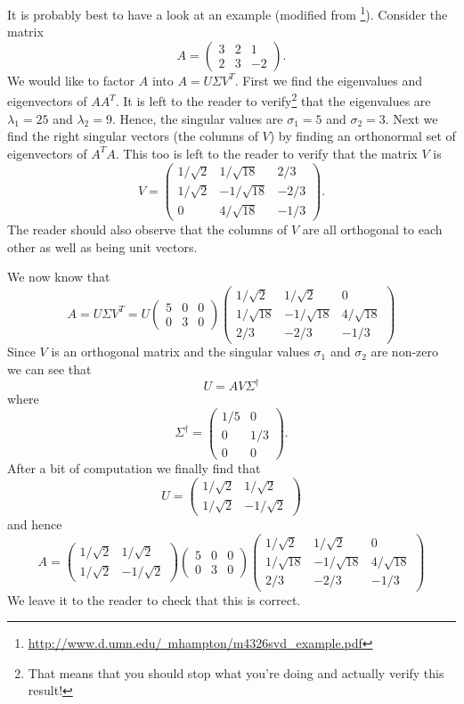It is probably best to have a look at an example (modified from
\footnote{\href{http://www.d.umn.edu/~mhampton/m4326svd_example.pdf}{http://www.d.umn.edu/~mhampton/m4326svd\_example.pdf}}).  Consider the matrix 
\[ A = \begin{pmatrix} 3 & 2 & 1 \\ 2 & 3 & -2 \end{pmatrix}. \]
We would like to factor $A$ into $A = U \Sigma V^T$.  First we find the eigenvalues and
eigenvectors of $AA^T$.  It is left to the reader to verify\footnote{That means that you
should stop what you're doing and actually verify this result!} that the eigenvalues are
$\lambda_1 = 25$ and $\lambda_2 = 9$.  Hence, the singular values are $\sigma_1 = 5$ and
$\sigma_2 = 3$.  Next we find the right singular vectors (the columns of $V$) by finding
an orthonormal set of eigenvectors of $A^TA$.  This too is left to the reader to verify
that the matrix $V$ is 
\[ V = \begin{pmatrix}
        1/\sqrt{2} & 1/\sqrt{18} & 2/3 \\
        1/\sqrt{2} & -1/\sqrt{18} & -2/3 \\
        0 & 4/\sqrt{18} & -1/3 
    \end{pmatrix}. \]
The reader should also observe that the columns of $V$ are all orthogonal to each other as
well as being unit vectors.

We now know that 
\[ A = U \Sigma V^T = U \begin{pmatrix} 5 & 0 & 0 \\ 0 & 3 & 0 \end{pmatrix} \begin{pmatrix} 1/\sqrt{2} & 1/\sqrt{2} & 0 \\ 1/\sqrt{18} & -1/\sqrt{18} &
        4/\sqrt{18} \\ 2/3 & -2/3 & -1/3 \end{pmatrix} \]
Since $V$ is an orthogonal matrix and the singular values $\sigma_1$ and $\sigma_2$ are
non-zero we can see that 
\[ U = AV\Sigma^\dagger \]
where 
\[ \Sigma^\dagger = \begin{pmatrix} 1/5 & 0 \\ 0 & 1/3 \\ 0 & 0 \end{pmatrix}. \]
After a bit of computation we finally find that 
\[ U = \begin{pmatrix} 1/\sqrt{2} & 1/\sqrt{2} \\ 1/\sqrt{2} & -1/\sqrt{2} \end{pmatrix}
        \]
and hence
\[ A = \begin{pmatrix} 1/\sqrt{2} & 1/\sqrt{2} \\ 1/\sqrt{2} & -1/\sqrt{2} \end{pmatrix} \begin{pmatrix} 5 & 0 & 0 \\ 0 & 3 & 0 \end{pmatrix} \begin{pmatrix} 1/\sqrt{2} & 1/\sqrt{2} & 0 \\ 1/\sqrt{18} & -1/\sqrt{18} &
        4/\sqrt{18} \\ 2/3 & -2/3 & -1/3 \end{pmatrix} \]
We leave it to the reader to check that this is correct.  

